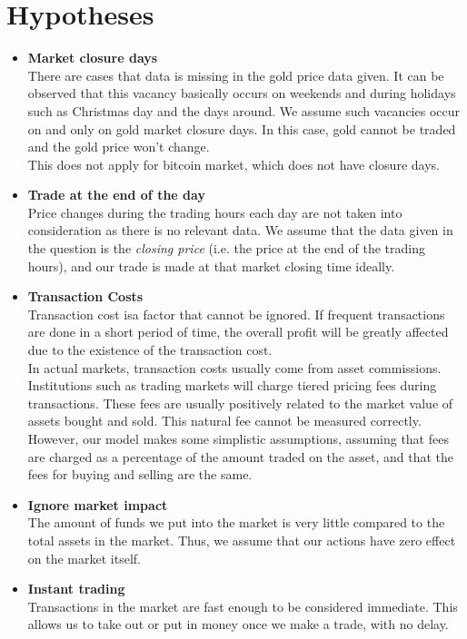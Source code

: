 \documentclass{mcmthesis}
\begin{document}
\section{Hypotheses}

\begin{itemize}
  \item \textbf{Market closure days}\\
  There are cases that data is missing in the gold price data given.
  It can be observed that this vacancy basically occurs on weekends
  and during holidays such as Christmas day and the days around.
  We assume such vacancies occur on and only on gold market closure days.
  In this case, gold cannot be traded and the gold price won't change.\\
  This does not apply for bitcoin market, which does not have closure days.
  \item \textbf{Trade at the end of the day}\\
  Price changes during the trading hours each day are not taken into consideration
  as there is no relevant data.
  We assume that the data given in the question is the \textit{closing price}
  (i.e. the price at the end of the trading hours),
  and our trade is made at that market closing time ideally.
  \item \textbf{Transaction Costs}\\
  Transaction cost isa factor that cannot be ignored. If frequent transactions are done in a short period of time, the overall profit will be greatly affected due to the existence of the transaction cost.\\
  In actual markets, transaction costs usually come from asset commissions. Institutions such as trading markets will charge tiered pricing fees during transactions. These fees are usually positively related to the market value of assets bought and sold. This natural fee cannot be measured correctly. However, our model makes some simplistic assumptions, assuming that fees are charged as a percentage of the amount traded on the asset, and that the fees for buying and selling are the same.
  \item \textbf{Ignore market impact}\\
  The amount of funds we put into the market is very little
  compared to the total assets in the market.
  Thus, we assume that our actions have zero effect on the market itself.
  \item \textbf{Instant trading}\\
  Transactions in the market are fast enough to be considered immediate.
  This allows us to take out or put in money once we make a trade, with no delay.
\end{itemize}
\end{document}
